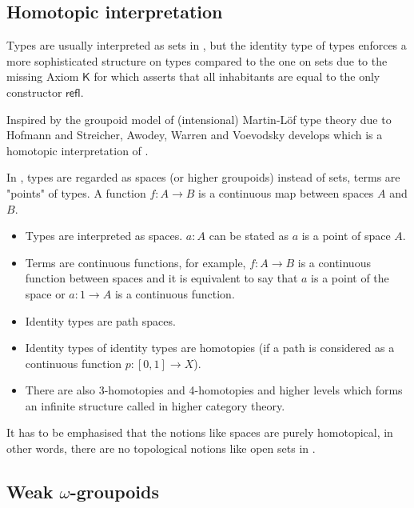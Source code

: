\subsection{Homotopic interpretation}\label{hottinterpretation}

Types are usually interpreted as sets in \mltt, but the identity type of types enforces a more sophisticated structure on types compared to the one on sets due to the missing Axiom $\mathsf{K}$ for which asserts that all inhabitants are equal to the only constructor $\mathsf{refl}$. 

Inspired by the groupoid model of (intensional) Martin-Löf type theory due to Hofmann and Streicher, Awodey, Warren \cite{awodey-warren} and Voevodsky \cite{VV} develops \hott which is a homotopic interpretation of \mltt.

In \hott, types are regarded as spaces (or higher groupoids) instead of sets, terms are "points" of types. A function $f : A \to B$ is a continuous map between spaces $A$ and $B$.

\begin{itemize}
\item Types are interpreted as spaces. $a : A$ can be stated as $a$ is
  a point of space $A$.
\item Terms are continuous functions, for example, $f : A \rightarrow B$ is a
  continuous function between spaces and it is equivalent to say that $a$ is
  a point of the space or $a : 1 \rightarrow A$ is a continuous function.
\item Identity types are path spaces.
\item Identity types of identity types are homotopies (if a path is considered as a continuous function $p : [0,1] \rightarrow X$).
\item There are also 3-homotopies and 4-homotopies and higher
  levels which forms an infinite structure called \og in higher category theory.
\end{itemize}

\begin{remark}
It has to be emphasised that the notions like spaces are purely homotopical, in other words, there are no topological notions like open sets in \hott. 
\end{remark}


\subsection{Weak $\omega$-groupoids}\label{wogintro}


